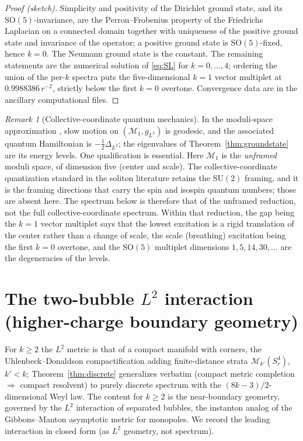 \documentclass[11pt,letterpaper]{article}
\newcommand{\cM}{\mathcal{M}}
\newcommand{\Lap}{\Delta}
\newcommand{\SO}{\mathrm{SO}}
\theoremstyle{plain}
\theoremstyle{remark}
\newtheorem{remark}[theorem]{Remark}
\begin{document}
\begin{proof}[Proof (sketch)]
Simplicity and positivity of the Dirichlet ground state, and its $\SO(5)$-invariance, are the Perron--Frobenius property of the Friedrichs Laplacian on a connected domain together with uniqueness of the positive ground state and invariance of the operator; a positive ground state is $\SO(5)$-fixed, hence $k=0$. The Neumann ground state is the constant. The remaining statements are the numerical solution of \eqref{eq:SL} for $k=0,\dots,4$; ordering the union of the per-$k$ spectra puts the five-dimensional $k=1$ vector multiplet at $0.9988386\,r^{-2}$, strictly below the first $k=0$ overtone. Convergence data are in the ancillary computational files.
\end{proof}

\begin{remark}[Collective-coordinate quantum mechanics]\label{rmk:qm}
In the moduli-space approximation \cite{FS2016}, slow motion on $(\cM_1,g_{L^2})$ is geodesic, and the associated quantum Hamiltonian is $-\tfrac12\Lap_{L^2}$; the eigenvalues of Theorem~\ref{thm:groundstate} are its energy levels. One qualification is essential. Here $\cM_1$ is the \emph{unframed} moduli space, of dimension five (center and scale). The collective-coordinate quantization standard in the soliton literature retains the $\mathrm{SU}(2)$ framing, and it is the framing directions that carry the spin and isospin quantum numbers; those are absent here. The spectrum below is therefore that of the unframed reduction, not the full collective-coordinate spectrum. Within that reduction, the gap being the $k=1$ vector multiplet says that the lowest excitation is a rigid translation of the center rather than a change of scale, the scale (breathing) excitation being the first $k=0$ overtone, and the $\SO(5)$ multiplet dimensions $1,5,14,30,\dots$ are the degeneracies of the levels.
\end{remark}

\section{The two-bubble $L^2$ interaction (higher-charge boundary geometry)}\label{sec:cross-term}

For $k\ge2$ the $L^2$ metric is that of a compact manifold with corners, the Uhlenbeck--Donaldson compactification adding finite-distance strata $\cM_{k'}(S^4_r)$, $k'<k$; Theorem~\ref{thm:discrete} generalizes verbatim (compact metric completion $\Rightarrow$ compact resolvent) to purely discrete spectrum with the $(8k-3)/2$-dimensional Weyl law. The content for $k\ge2$ is the near-boundary geometry, governed by the $L^2$ interaction of separated bubbles, the instanton analog of the Gibbons--Manton asymptotic metric for monopoles. We record the leading interaction in closed form (as $L^2$ geometry, not spectrum).
\end{document}
